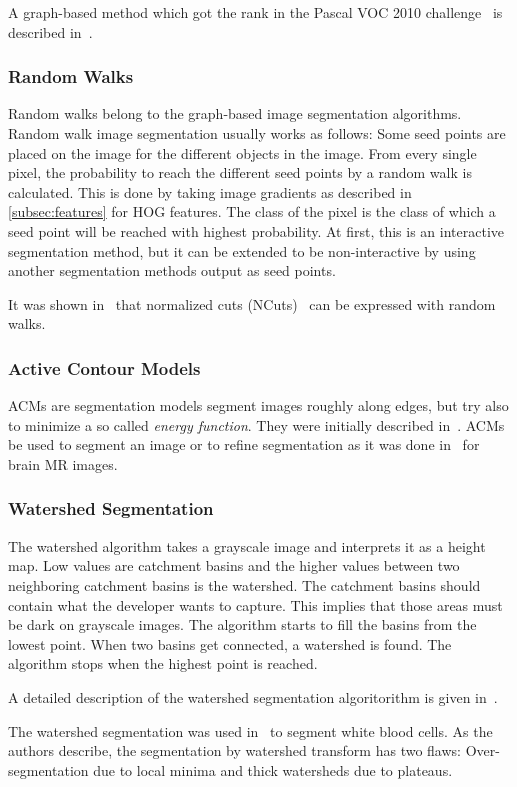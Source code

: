 A graph-based method which got the  rank in the Pascal VOC 2010
challenge~\cite{everingham2010pascal} is described
in~\cite{carreira2010constrained}.


\subsubsection{Random Walks}

Random walks belong to the graph-based image segmentation algorithms. Random
walk image segmentation usually works as follows: Some seed points are placed
on the image for the different objects in the image. From every single pixel,
the probability to reach the different seed points by a random walk is
calculated. This is done by taking image gradients as described in
\cref{subsec:features} for \gls{HOG} features. The class of the pixel is the
class of which a seed point will be reached with highest probability. At first,
this is an interactive segmentation method, but it can be extended to be
non-interactive by using another segmentation methods output as seed points.

It was shown in~\cite{meilpa2001learning} that normalized cuts
(NCuts)~\cite{shi2000normalized} can be expressed with random walks.


\subsubsection{Active Contour Models}

\Glspl{ACM} are segmentation models segment images roughly along edges, but
try also to minimize a so called \textit{energy function}. They were initially
described in~\cite{kass1988snakes}. \Glspl{ACM} be used to segment an image or
to refine segmentation as it was done in~\cite{atkins1998fully} for brain
\gls{MR} images.


\subsubsection{Watershed Segmentation}\label{subsec:watershed}
The watershed algorithm takes a grayscale image and interprets it as a height
map. Low values are catchment basins and the higher values between two
neighboring catchment basins is the watershed. The catchment basins should
contain what the developer wants to capture. This implies that those areas
must be dark on grayscale images. The algorithm starts to fill the basins from
the lowest point. When two basins get connected, a watershed is found. The
algorithm stops when the highest point is reached.

A detailed description of the watershed segmentation algoritorithm is given
in~\cite{roerdink2000watershed}.

The watershed segmentation was used in~\cite{1260033} to segment white blood
cells. As the authors describe, the segmentation by watershed transform has
two flaws: Over-segmentation due to local minima and thick watersheds due to
plateaus.